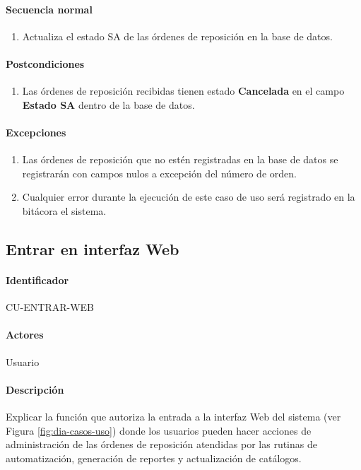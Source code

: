 \paragraph{Secuencia normal}
\begin{enumerate}
  \item Actualiza el estado SA de las órdenes de reposición en la base de datos.
\end{enumerate}
\paragraph{Postcondiciones}
\begin{enumerate}
  \item Las órdenes de reposición recibidas tienen estado \textbf{Cancelada} en el campo \textbf{Estado SA} dentro de la base de datos.
\end{enumerate}
\paragraph{Excepciones}
\begin{enumerate}
  \item Las órdenes de reposición que no estén registradas en la base de datos se registrarán con campos nulos a excepción del número de orden.
  \item Cualquier error durante la ejecución de este caso de uso será registrado en la bitácora el sistema.
\end{enumerate}


\subsection{Entrar en interfaz Web}\label{cu-entrar-web}
\paragraph{Identificador}
CU-ENTRAR-WEB
\paragraph{Actores}
Usuario
\paragraph{Descripción}
Explicar la función que autoriza la entrada a la interfaz Web del sistema (ver Figura \ref{fig:dia-casos-uso}) donde los usuarios pueden hacer acciones de administración de las órdenes de reposición atendidas por las rutinas de automatización, generación de reportes y actualización de catálogos.
